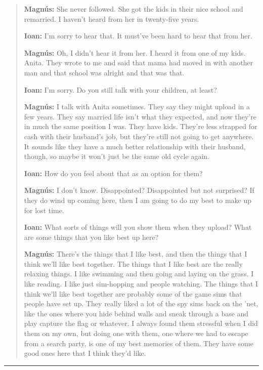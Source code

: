 \begin{quote}
\textbf{Magnús:} She never followed. She got the kids in their nice school and remarried. I haven't heard from her in twenty-five years.

\textbf{Ioan:} I'm sorry to hear that. It must've been hard to hear that from her.

\textbf{Magnús:} Oh, I didn't hear it from her. I heard it from one of my kids. Anita. They wrote to me and said that mama had moved in with another man and that school was alright and that was that.

\textbf{Ioan:} I'm sorry. Do you still talk with your children, at least?

\textbf{Magnús:} I talk with Anita sometimes. They say they might upload in a few years. They say married life isn't what they expected, and now they're in much the same position I was. They have kids. They're less strapped for cash with their husband's job, but they're still not going to get anywhere. It sounds like they have a much better relationship with their husband, though, so maybe it won't just be the same old cycle again.

\textbf{Ioan:} How do you feel about that as an option for them?

\textbf{Magnús:} I don't know. Disappointed? Disappointed but not surprised? If they do wind up coming here, then I am going to do my best to make up for lost time.

\textbf{Ioan:} What sorts of things will you show them when they upload? What are some things that you like best up here?

\textbf{Magnús:} There's the things that I like best, and then the things that I think we'll like best together. The things that I like best are the really relaxing things. I like swimming and then going and laying on the grass. I like reading. I like just sim-hopping and people watching. The things that I think we'll like best together are probably some of the game sims that people have set up. They really liked a lot of the spy sims back on the 'net, like the ones where you hide behind walls and sneak through a base and play capture the flag or whatever. I always found them stressful when I did them on my own, but doing one with them, one where we had to escape from a search party, is one of my best memories of them. They have some good ones here that I think they'd like.
\end{quote}

\begin{center}\rule{0.5\linewidth}{0.5pt}\end{center}

